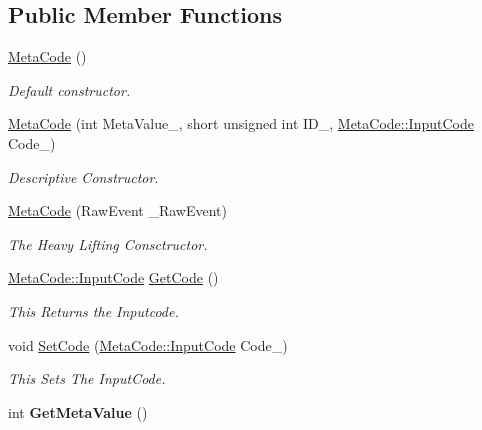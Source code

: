 \subsection*{Public Member Functions}
\begin{DoxyCompactItemize}
\item 
\hyperlink{classMetaCode_a6d4637b2894e5a2d46577c08259a2416}{MetaCode} ()
\begin{DoxyCompactList}\small\item\em Default constructor. \item\end{DoxyCompactList}\item 
\hyperlink{classMetaCode_a8f333b3a35badcda068fa44c7ee1f572}{MetaCode} (int MetaValue\_\-, short unsigned int ID\_\-, \hyperlink{classMetaCode_a7390e6f58e25c0ce377bba4e63081b24}{MetaCode::InputCode} Code\_\-)
\begin{DoxyCompactList}\small\item\em Descriptive Constructor. \item\end{DoxyCompactList}\item 
\hyperlink{classMetaCode_ad0a739796fa1de2991c196d8ee7b19b2}{MetaCode} (RawEvent \_\-RawEvent)
\begin{DoxyCompactList}\small\item\em The Heavy Lifting Consctructor. \item\end{DoxyCompactList}\item 
\hyperlink{classMetaCode_a7390e6f58e25c0ce377bba4e63081b24}{MetaCode::InputCode} \hyperlink{classMetaCode_a862b35146ab4aa24f78bf951cfa21aa8}{GetCode} ()
\begin{DoxyCompactList}\small\item\em This Returns the Inputcode. \item\end{DoxyCompactList}\item 
void \hyperlink{classMetaCode_acfc73f0b06c9a727f59681779caed03d}{SetCode} (\hyperlink{classMetaCode_a7390e6f58e25c0ce377bba4e63081b24}{MetaCode::InputCode} Code\_\-)
\begin{DoxyCompactList}\small\item\em This Sets The InputCode. \item\end{DoxyCompactList}\item 
\hypertarget{classMetaCode_a6a33ef9b7e2414ecfd97aadb14eca2de}{
int {\bfseries GetMetaValue} ()}
\label{d7/d72/classMetaCode_a6a33ef9b7e2414ecfd97aadb14eca2de}


\end{DoxyCompactItemize}
